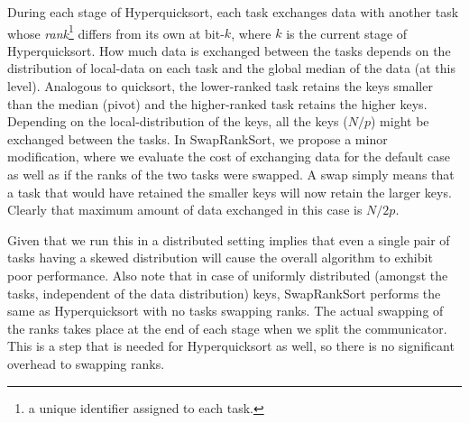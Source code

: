 During each stage of Hyperquicksort, each task exchanges data with another task whose {\em rank}\footnote{a unique identifier assigned to each task.} differs from its own at bit-$k$, where $k$ is the current stage of Hyperquicksort. How much data is exchanged between the tasks depends on the distribution of local-data on each task and the global median of the data (at this level). Analogous to quicksort, the lower-ranked task retains the keys smaller than the median (pivot) and the higher-ranked task retains the higher keys. Depending on the local-distribution of the keys, all the keys ($N/p$) might be exchanged between the tasks. In {\sc SwapRankSort}, we propose a minor modification, where we evaluate the cost of exchanging data for the default case as well as if the ranks of the two tasks were swapped. A swap simply means that a task that would have retained the smaller keys will now retain the larger keys. Clearly that maximum amount of data exchanged in this case is $N/2p$. 

Given that we run this in a distributed setting implies that even a single pair of tasks having a skewed distribution will cause the overall algorithm to exhibit poor performance. Also note that in case of uniformly distributed (amongst the tasks, independent of the data distribution) keys, {\sc SwapRankSort} performs the same as Hyperquicksort with no tasks swapping ranks. The actual swapping of the ranks takes place at the end of each stage when we split the communicator. This is a step that is needed for Hyperquicksort as well, so there is no significant overhead to swapping ranks. 
